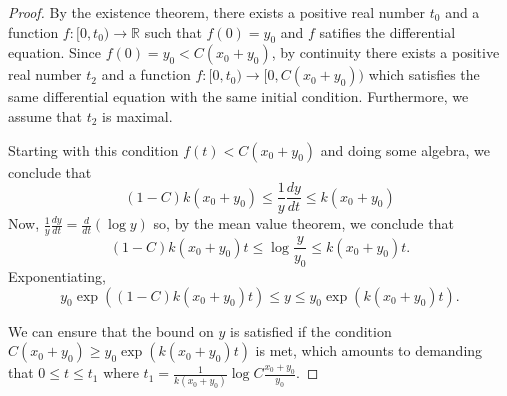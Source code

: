 \documentclass[12pt]{article}
\begin{document}
\begin{proof}
By the existence theorem, there exists a positive real number 
$t_{0}$ and a function  $f \colon [0,t_{0}) \to \mathbb{R}$
such that $f(0) = y_0$ and $f$ satifies the differential equation. 
Since $f(0) = y_0 < C (x_0 + y_0)$, by continuity there exists 
a positive real number $t_2$ and a function $f \colon [0,t_{0}) \to [0, C (x_0 + y_0))$
which satisfies the same differential equation with the same 
initial condition.  Furthermore, we assume that $t_2$ is maximal.

Starting with this condition $f(t) < C (x_0 + y_0)$ and
doing some algebra, we conclude that
\[
 (1 - C) k (x_0 + y_0) \le \frac{1}{y} \frac{dy}{dt} \le k (x_0 + y_0)
\]
Now, $\frac{1}{y} \frac{dy}{dt} = \frac{d}{dt} (\log y)$ so, by the mean
value theorem, we conclude that
\[
 (1 - C) k (x_0 + y_0) t \le \log \frac{y}{y_0} \le k (x_0 + y_0) t .
\]
Exponentiating,
\[
 y_0 \exp ((1 - C) k (x_0 + y_0) t) \le y \le y_0 \exp (k (x_0 + y_0) t)  .
\]


We can ensure that the bound on $y$ is satisfied if the condition
$C (x_0 + y_0) \ge y_0 \exp (k (x_0 + y_0) t)$ is met, which amounts to
demanding that $0 \le t \le t_1$ where $t_1 = \frac{1}{k (x_0 + y_0)}
\log C \frac{x_0 + y_0}{y_0}$.

\end{proof}
\end{document}
